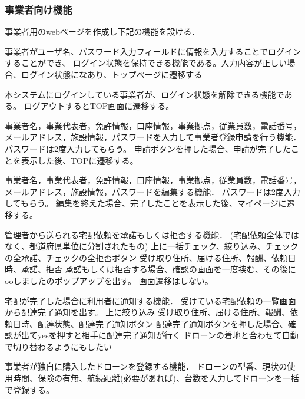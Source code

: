 \documentclass[a4paper, titlepage]{jsarticle}
\begin{document}
\subsubsection{事業者向け機能}
事業者用のwebページを作成し下記の機能を設ける．
\begin{description}[labelwidth=\linewidth]
  \setlength{\leftskip}{1em}
  \item [ログイン機能] 事業者がユーザ名、パスワード入力フィールドに情報を入力することでログインすることができ、
  ログイン状態を保持できる機能である。入力内容が正しい場合、ログイン状態になあり、トップページに遷移する
  \item [ログアウト機能] 本システムにログインしている事業者が、ログイン状態を解除できる機能である。
  ログアウトするとTOP画面に遷移する。
  \item [事業者登録申請機能] 事業者名，事業代表者，免許情報，口座情報，事業拠点，従業員数，電話番号，メールアドレス，施設情報，パスワードを入力して事業者登録申請を行う機能．
  パスワードは2度入力してもらう。
  申請ボタンを押した場合、申請が完了したことを表示した後、TOPに遷移する。
  \item [事業者情報編集機能] 事業者名，事業代表者，免許情報，口座情報，事業拠点，従業員数，電話番号，メールアドレス，施設情報，パスワードを編集する機能．
  パスワードは2度入力してもらう。
  編集を終えた場合、完了したことを表示した後、マイページに遷移する。

  \item [依頼受注判断機能] 管理者から送られる宅配依頼を承諾もしくは拒否する機能．
  (宅配依頼全体ではなく、都道府県単位に分割されたもの)
  上に一括チェック、絞り込み、チェックの全承諾、チェックの全拒否ボタン
  受け取り住所、届ける住所、報酬、依頼日時、承諾、拒否
  承諾もしくは拒否する場合、確認の画面を一度挟む、その後にooしましたのポップアップを出す。
  画面遷移はしない。

  \item [配達完了通知機能] 宅配が完了した場合に利用者に通知する機能．
  受けている宅配依頼の一覧画面から配達完了通知を出す。
  上に絞り込み
  受け取り住所、届ける住所、報酬、依頼日時、配達状態、配達完了通知ボタン
  配達完了通知ボタンを押した場合、確認が出てyesを押すと相手に配達完了通知が行く
  ドローンの着地と合わせて自動で切り替わるようにもしたい

  \item [使用ドローン登録機能] 事業者が独自に購入したドローンを登録する機能．
  ドローンの型番、現状の使用時間、保険の有無、航続距離(必要があれば)、台数を入力してドローンを一括で登録する。


\end{description}
\end{document}
